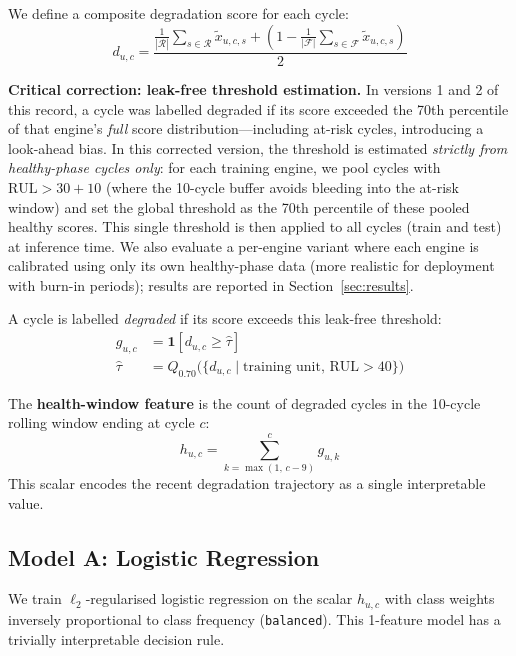 \documentclass[10pt,twocolumn]{article}
\begin{document}
We define a composite degradation score for each cycle:
\begin{equation}
  d_{u,c}=
  \frac{
    \tfrac{1}{|\mathcal{R}|}\!\sum_{s\in\mathcal{R}}\tilde{x}_{u,c,s}
    +\!\left(1-\tfrac{1}{|\mathcal{F}|}\!\sum_{s\in\mathcal{F}}\tilde{x}_{u,c,s}\right)
  }{2}
  \label{eq:score}
\end{equation}

\noindent\textbf{Critical correction: leak-free threshold estimation.}
In versions 1 and 2 of this record, a cycle was labelled degraded if its score exceeded the
70th percentile of that engine's \textit{full} score distribution---including at-risk
cycles, introducing a look-ahead bias.
In this corrected version, the threshold is estimated \textit{strictly from healthy-phase
cycles only}: for each training engine, we pool cycles with $\mathrm{RUL} > 30 + 10$
(where the 10-cycle buffer avoids bleeding into the at-risk window) and set the
global threshold as the 70th percentile of these pooled healthy scores.
This single threshold is then applied to all cycles (train and test) at inference time.
We also evaluate a per-engine variant where each engine is calibrated using only its own
healthy-phase data (more realistic for deployment with burn-in periods); results are
reported in Section~\ref{sec:results}.

A cycle is labelled \emph{degraded} if its score exceeds this leak-free threshold:
\begin{align}
  g_{u,c} &= \mathbf{1}\!\left[d_{u,c}\geq \hat{\tau}\right] \\
  \hat{\tau} &= Q_{0.70}\bigl(\{d_{u,c} \mid \text{training unit, RUL} > 40\}\bigr)
\end{align}

The \textbf{health-window feature} is the count of degraded cycles in the 10-cycle
rolling window ending at cycle $c$:
\begin{equation}
  h_{u,c}=\sum_{k=\max(1,\,c-9)}^{c}g_{u,k}
\end{equation}
This scalar encodes the recent degradation trajectory as a single interpretable value.

\subsection{Model A: Logistic Regression}

We train $\ell_2$-regularised logistic regression on the scalar $h_{u,c}$ with
class weights inversely proportional to class frequency (\texttt{balanced}).
This 1-feature model has a trivially interpretable decision rule.
\end{document}
